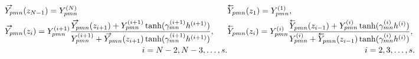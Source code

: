 \begin{subequations}
  \begin{align}
    &\Yright_{pmn}(z_{N-1}) = Y_{pmn}^{(N)} \\
    &\Yright_{pmn}(z_i) = Y_{pmn}^{(i+1)} 
    \frac%
    {\Yright_{pmn}(z_{i+1}) + 
      Y_{pmn}^{(i+1)}\tanh(\gamma_{mn}^{(i+1)} h^{(i+1)})}%
    {Y_{pmn}^{(i+1)} + \Yright_{pmn}(z_{i+1})\tanh(\gamma_{mn}^{(i+1)}
      h^{(i+1)})}, 
    \notag \\
    & \mkern300mu i = N-2,N-3,\ldots,s.
  \end{align}
  \begin{align}
    &\Yleft_{pmn}(z_{1}) = Y_{pmn}\one, \\
    &\Yleft_{pmn}(z_i) = Y_{pmn}\eye 
    \frac%
    {\Yleft_{pmn}(z_{i-1}) + Y_{pmn}\eye \tanh(\gamma_{mn}\eye h\eye)}%
    {Y_{pmn}\eye + \Yleft_{pmn}(z_{i-1})\tanh(\gamma_{mn}\eye h\eye)}, \notag \\
    & \mkern300mu i = 2,3,\ldots,s.
  \end{align}
\end{subequations}

